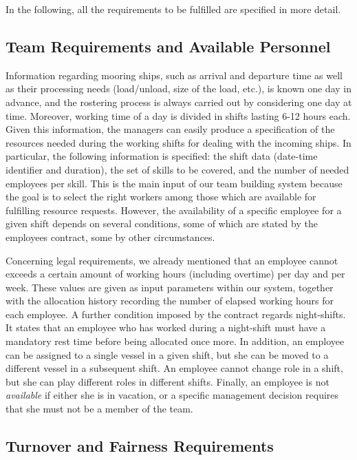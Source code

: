 \documentclass{tlp}
\begin{document}
In the following, all the requirements to be fulfilled are specified in more detail.

\subsection{Team Requirements and Available Personnel}
Information regarding mooring ships, such as arrival and departure time
as well as their processing needs (load/unload, size of the load, etc.), is known
one day in advance, and the rostering process is always carried out by considering one day at time.
Moreover, working time of a day is divided in shifts lasting 6-12 hours each.
Given this information, the  managers can easily produce
a specification of the resources needed during the working shifts for dealing with the incoming ships.
In particular,  the following information is specified: the shift data (date-time identifier and duration),
the set of skills to be covered, and the number of needed employees per skill.
This is the main input of our team building system because the goal
is to select the right workers among those which are available for
fulfilling resource requests.
However, the availability of a specific employee for a given shift depends on several conditions,
some of which are stated by the employees contract, some by other circumstances.

Concerning legal requirements, we already mentioned that an employee
cannot exceeds a certain amount of working hours (including overtime) per day and per week.
These values are given as input parameters within our system, together with the allocation
history recording the number of elapsed working hours for each employee.
A further condition imposed by the contract regards night-shifts.
It states that an employee who has worked during a night-shift
must have a mandatory rest time before being allocated once more.
In addition, an employee can be assigned to a single vessel in a given shift, but she can be moved to a different vessel in a subsequent shift.
An employee cannot change role in a shift, but she can play different roles in different shifts.
Finally, an employee is not \emph{available} if either she is in vacation, or
a specific management decision requires that she must not be a member of the team.

\subsection{Turnover and Fairness Requirements}
\end{document}
